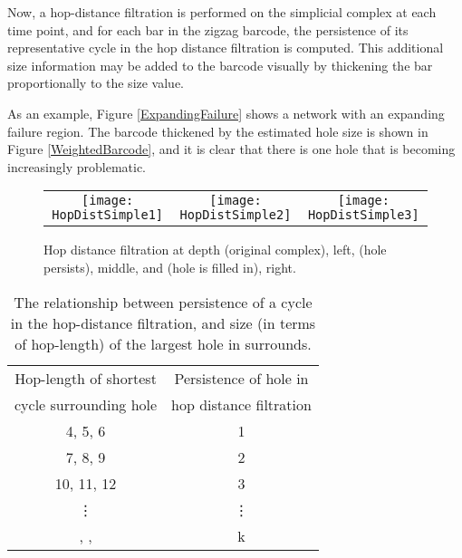 \documentclass[12pt]{article}
\begin{document}
Now, a hop-distance filtration is performed on the simplicial complex at each time point, and for each bar in the zigzag barcode, the persistence of its representative cycle in the hop distance filtration is computed. This additional size information may be added to the barcode visually by thickening the bar proportionally to the size value.

As an example, Figure \ref{ExpandingFailure} shows a network with an expanding failure region. The barcode thickened by the estimated hole size is shown in Figure \ref{WeightedBarcode}, and it is clear that there is one hole that is becoming increasingly problematic.


\begin{figure}[htp]
\begin{center}
\begin{tabular}{ccc}
\texttt{[image: HopDistSimple1]} & \texttt{[image: HopDistSimple2]} & \texttt{[image: HopDistSimple3]} \\
\end{tabular}
\end{center}
\caption{Hop distance filtration at depth  (original complex), left,  (hole persists), middle, and  (hole is filled in), right. \label{HopFilt}}
\end{figure}

\begin{table}
\begin{center}
\begin{tabular}{|c|c|}
\hline
Hop-length of shortest & Persistence of hole in \\
cycle surrounding hole & hop distance filtration \\
\hline
4, 5, 6 & 1 \\
7, 8, 9 & 2 \\
10, 11, 12 & 3 \\
\vdots & \vdots \\
, ,  & k \\
\hline
\end{tabular}
\end{center}
\caption{The relationship between persistence of a cycle in the hop-distance filtration, and size (in terms of hop-length) of the largest hole in surrounds. \label{HopSizes}}
\end{table}
\end{document}
